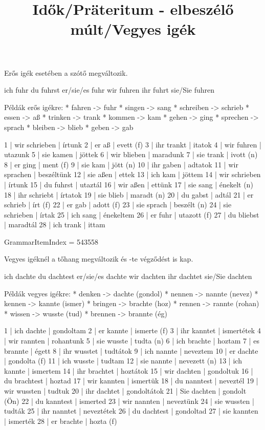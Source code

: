 \begin{desc}
Erős igék esetében a szótő megváltozik.

ich fuhr
du fuhrst
er/sie/es fuhr
wir fuhren
ihr fuhrt
sie/Sie fuhren

Példák erős igékre:
* fahren -> fuhr
* singen -> sang
* schreiben -> schrieb
* essen -> aß
* trinken -> trank
* kommen -> kam
* gehen -> ging
* sprechen -> sprach
* bleiben -> blieb
* geben -> gab
\end{desc}

\begin{exmp}
1 | wir schrieben | írtunk
2 | er aß | evett (f)
3 | ihr trankt | itatok
4 | wir fuhren | utazunk
5 | sie kamen | jöttek
6 | wir blieben | maradunk
7 | sie trank | ivott (n)
8 | er ging | ment (f)
9 | sie kam | jött (n)
10 | ihr gaben | adtatok
11 | wir sprachen | beszéltünk
12 | sie aßen | ettek
13 | ich kam | jöttem
14 | wir schrieben | írtunk
15 | du fuhrst | utaztál
16 | wir aßen | ettünk
17 | sie sang | énekelt (n)
18 | ihr schriebt | írtatok
19 | sie blieb | maradt (n)
20 | du gabst | adtál
21 | er schrieb | írt (f)
22 | er gab | adott (f)
23 | sie sprach | beszélt (n)
24 | sie schrieben | írtak
25 | ich sang | énekeltem
26 | er fuhr | utazott (f)
27 | du bliebst | maradtál
28 | ich trank | ittam
\end{exmp}

\title{Idők/Präteritum - elbeszélő múlt/Vegyes igék}

GrammarItemIndex = 543558

\begin{desc}
Vegyes igéknél a tőhang megváltozik és -te végződést is kap.

ich dachte
du dachtest
er/sie/es dachte
wir dachten
ihr dachtet
sie/Sie dachten

Példák vegyes igékre:
* denken -> dachte (gondol)
* nennen -> nannte (nevez)
* kennen -> kannte (ismer)
* bringen -> brachte (hoz)
* rennen -> rannte (rohan)
* wissen -> wusste (tud)
* brennen -> brannte (ég)
\end{desc}

\begin{exmp}
1 | ich dachte | gondoltam
2 | er kannte | ismerte (f)
3 | ihr kanntet | ismertétek
4 | wir rannten | rohantunk
5 | sie wusste | tudta (n)
6 | ich brachte | hoztam
7 | es brannte | égett
8 | ihr wusstet | tudtátok
9 | ich nannte | neveztem
10 | er dachte | gondolta (f)
11 | ich wusste | tudtam
12 | sie nannte | nevezett (n)
13 | ich kannte | ismertem
14 | ihr brachtet | hoztátok
15 | wir dachten | gondoltuk
16 | du brachtest | hoztad
17 | wir kannten | ismertük
18 | du nanntest | neveztél
19 | wir wussten | tudtuk
20 | ihr dachtet | gondoltátok
21 | Sie dachten | gondolt (Ön)
22 | du kanntest | ismerted
23 | wir nannten | neveztünk
24 | sie wussten | tudták
25 | ihr nanntet | neveztétek
26 | du dachtest | gondoltad
27 | sie kannten | ismerték
28 | er brachte | hozta (f)
\end{exmp}


